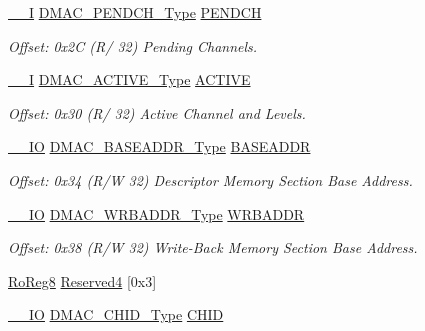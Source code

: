 \begin{DoxyCompactItemize}
\mbox{\hyperlink{core__cm0plus_8h_af63697ed9952cc71e1225efe205f6cd3}{\+\_\+\+\_\+I}} \mbox{\hyperlink{union_d_m_a_c___p_e_n_d_c_h___type}{D\+M\+A\+C\+\_\+\+P\+E\+N\+D\+C\+H\+\_\+\+Type}} \mbox{\hyperlink{struct_dmac_acf69858689aba40deb2d58ae55bd0006}{P\+E\+N\+D\+CH}}
\begin{DoxyCompactList}\small\item\em Offset\+: 0x2C (R/ 32) Pending Channels. \end{DoxyCompactList}\item 
\mbox{\hyperlink{core__cm0plus_8h_af63697ed9952cc71e1225efe205f6cd3}{\+\_\+\+\_\+I}} \mbox{\hyperlink{union_d_m_a_c___a_c_t_i_v_e___type}{D\+M\+A\+C\+\_\+\+A\+C\+T\+I\+V\+E\+\_\+\+Type}} \mbox{\hyperlink{struct_dmac_a9870bb49af321427ca8bdf49fa753ec2}{A\+C\+T\+I\+VE}}
\begin{DoxyCompactList}\small\item\em Offset\+: 0x30 (R/ 32) Active Channel and Levels. \end{DoxyCompactList}\item 
\mbox{\hyperlink{core__cm0plus_8h_aec43007d9998a0a0e01faede4133d6be}{\+\_\+\+\_\+\+IO}} \mbox{\hyperlink{union_d_m_a_c___b_a_s_e_a_d_d_r___type}{D\+M\+A\+C\+\_\+\+B\+A\+S\+E\+A\+D\+D\+R\+\_\+\+Type}} \mbox{\hyperlink{struct_dmac_a0d16ac99028838e03c07101c9461a101}{B\+A\+S\+E\+A\+D\+DR}}
\begin{DoxyCompactList}\small\item\em Offset\+: 0x34 (R/W 32) Descriptor Memory Section Base Address. \end{DoxyCompactList}\item 
\mbox{\hyperlink{core__cm0plus_8h_aec43007d9998a0a0e01faede4133d6be}{\+\_\+\+\_\+\+IO}} \mbox{\hyperlink{union_d_m_a_c___w_r_b_a_d_d_r___type}{D\+M\+A\+C\+\_\+\+W\+R\+B\+A\+D\+D\+R\+\_\+\+Type}} \mbox{\hyperlink{struct_dmac_ae67c9b5dfcbbc13be0738813e8cf1db5}{W\+R\+B\+A\+D\+DR}}
\begin{DoxyCompactList}\small\item\em Offset\+: 0x38 (R/W 32) Write-\/\+Back Memory Section Base Address. \end{DoxyCompactList}\item 
\mbox{\hyperlink{group___s_a_m_d21_e15_a__definitions_ga0d957f1433aaf5d70e4dc2b68288442d}{Ro\+Reg8}} \mbox{\hyperlink{struct_dmac_abf127d09ee1c1a9cf2b0d88d946dbe0a}{Reserved4}} \mbox{[}0x3\mbox{]}
\item 
\mbox{\hyperlink{core__cm0plus_8h_aec43007d9998a0a0e01faede4133d6be}{\+\_\+\+\_\+\+IO}} \mbox{\hyperlink{union_d_m_a_c___c_h_i_d___type}{D\+M\+A\+C\+\_\+\+C\+H\+I\+D\+\_\+\+Type}} \mbox{\hyperlink{struct_dmac_a8ca3ffa77dadd1671aea1c0dae79203e}{C\+H\+ID}}

\end{DoxyCompactItemize}

